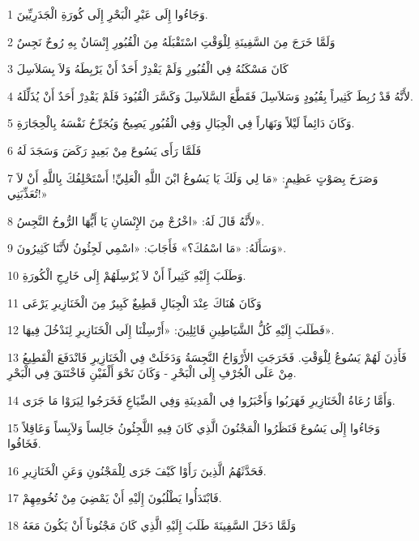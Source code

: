 \par 1 وَجَاءُوا إِلَى عَبْرِ الْبَحْرِ إِلَى كُورَةِ الْجَدَرِيِّينَ.
\par 2 وَلَمَّا خَرَجَ مِنَ السَّفِينَةِ لِلْوَقْتِ اسْتَقْبَلَهُ مِنَ الْقُبُورِ إِنْسَانٌ بِهِ رُوحٌ نَجِسٌ
\par 3 كَانَ مَسْكَنُهُ فِي الْقُبُورِ وَلَمْ يَقْدِرْ أَحَدٌ أَنْ يَرْبِطَهُ وَلاَ بِسَلاَسِلَ
\par 4 لأَنَّهُ قَدْ رُبِطَ كَثِيراً بِقُيُودٍ وَسَلاَسِلَ فَقَطَّعَ السَّلاَسِلَ وَكَسَّرَ الْقُيُودَ فَلَمْ يَقْدِرْ أَحَدٌ أَنْ يُذَلِّلَهُ.
\par 5 وَكَانَ دَائِماً لَيْلاً وَنَهَاراً فِي الْجِبَالِ وَفِي الْقُبُورِ يَصِيحُ وَيُجَرِّحُ نَفْسَهُ بِالْحِجَارَةِ.
\par 6 فَلَمَّا رَأَى يَسُوعَ مِنْ بَعِيدٍ رَكَضَ وَسَجَدَ لَهُ
\par 7 وَصَرَخَ بِصَوْتٍ عَظِيمٍ: «مَا لِي وَلَكَ يَا يَسُوعُ ابْنَ اللَّهِ الْعَلِيِّ! أَسْتَحْلِفُكَ بِاللَّهِ أَنْ لاَ تُعَذِّبَنِي!»
\par 8 لأَنَّهُ قَالَ لَهُ: «اخْرُجْ مِنَ الإِنْسَانِ يَا أَيُّهَا الرُّوحُ النَّجِسُ».
\par 9 وَسَأَلَهُ: «مَا اسْمُكَ؟» فَأَجَابَ: «اسْمِي لَجِئُونُ لأَنَّنَا كَثِيرُونَ».
\par 10 وَطَلَبَ إِلَيْهِ كَثِيراً أَنْ لاَ يُرْسِلَهُمْ إِلَى خَارِجِ الْكُورَةِ.
\par 11 وَكَانَ هُنَاكَ عِنْدَ الْجِبَالِ قَطِيعٌ كَبِيرٌ مِنَ الْخَنَازِيرِ يَرْعَى
\par 12 فَطَلَبَ إِلَيْهِ كُلُّ الشَّيَاطِينِ قَائِلِينَ: «أَرْسِلْنَا إِلَى الْخَنَازِيرِ لِنَدْخُلَ فِيهَا».
\par 13 فَأَذِنَ لَهُمْ يَسُوعُ لِلْوَقْتِ. فَخَرَجَتِ الأَرْوَاحُ النَّجِسَةُ وَدَخَلَتْ فِي الْخَنَازِيرِ فَانْدَفَعَ الْقَطِيعُ مِنْ عَلَى الْجُرْفِ إِلَى الْبَحْرِ - وَكَانَ نَحْوَ أَلْفَيْنِ فَاخْتَنَقَ فِي الْبَحْرِ.
\par 14 وَأَمَّا رُعَاةُ الْخَنَازِيرِ فَهَرَبُوا وَأَخْبَرُوا فِي الْمَدِينَةِ وَفِي الضِّيَاعِ فَخَرَجُوا لِيَرَوْا مَا جَرَى.
\par 15 وَجَاءُوا إِلَى يَسُوعَ فَنَظَرُوا الْمَجْنُونَ الَّذِي كَانَ فِيهِ اللَّجِئُونُ جَالِساً وَلاَبِساً وَعَاقِلاً فَخَافُوا.
\par 16 فَحَدَّثَهُمُ الَّذِينَ رَأَوْا كَيْفَ جَرَى لِلْمَجْنُونِ وَعَنِ الْخَنَازِيرِ.
\par 17 فَابْتَدَأُوا يَطْلُبُونَ إِلَيْهِ أَنْ يَمْضِيَ مِنْ تُخُومِهِمْ.
\par 18 وَلَمَّا دَخَلَ السَّفِينَةَ طَلَبَ إِلَيْهِ الَّذِي كَانَ مَجْنُوناً أَنْ يَكُونَ مَعَهُ
